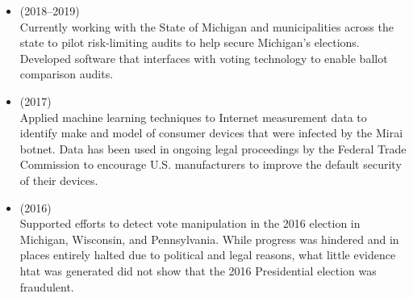 \documentclass[11pt]{article}
\begin{document}
{%

\vspace{-6pt}


\begin{itemize}[label={--\ },leftmargin=0.25in,labelsep=0.1625em]
\addtolength{\itemsep}{-0.25\baselineskip}

\item{} (2018--2019)\\
{\small Currently working with the State of Michigan and municipalities across the state to pilot risk-limiting audits to help secure Michigan's elections. Developed software that interfaces with voting technology to enable ballot comparison audits.}

\item{} (2017)\\
{\small Applied machine learning techniques to Internet measurement data to identify make and model of consumer devices that were infected by the Mirai botnet. Data has been used in ongoing legal proceedings by the Federal Trade Commission to encourage U.S. manufacturers to improve the default security of their devices.}
\item{} (2016)\\
{\small Supported efforts to detect vote manipulation in the 2016 election in Michigan, Wisconsin, and Pennsylvania. While progress was hindered and in places entirely halted due to political and legal reasons, what little evidence htat was generated did not show that the 2016 Presidential election was fraudulent.}
\end{itemize}

}
\end{document}
